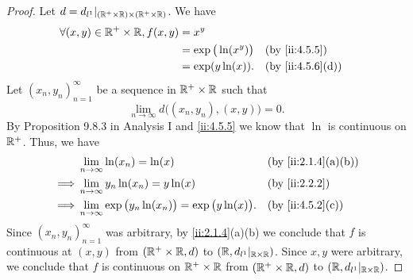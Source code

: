 \begin{proof}
  Let \(d = d_{l^1}|_{(\mathbb{R}^+ \times \mathbb{R}) \times (\mathbb{R}^+ \times \mathbb{R})}\).
  We have
  \begin{align*}
    \forall (x, y) \in \R^+ \times \R, f(x, y) & = x^y                                          \\
                                               & = \exp\big(\ln(x^y)\big) &  & \by{ii:4.5.5}    \\
                                               & = \exp(y \ln(x)).        &  & \by{ii:4.5.6}[d]
  \end{align*}
  Let \((x_n, y_n)_{n = 1}^\infty\) be a sequence in \(\mathbb{R}^+ \times \mathbb{R}\) such that
  \[
    \lim_{n \to \infty} d\big((x_n, y_n), (x, y)\big) = 0.
  \]
  By Proposition 9.8.3 in Analysis I and \cref{ii:4.5.5} we know that \(\ln\) is continuous on \(\mathbb{R}^+\).
  Thus, we have
  \begin{align*}
             & \lim_{n \to \infty} \ln(x_n) = \ln(x)                                    &  & \by{ii:2.1.4}[a,b] \\
    \implies & \lim_{n \to \infty} y_n \ln(x_n) = y \ln(x)                              &  & \by{ii:2.2.2}      \\
    \implies & \lim_{n \to \infty} \exp\big(y_n \ln(x_n)\big) = \exp\big(y \ln(x)\big). &  & \by{ii:4.5.2}[c]
  \end{align*}
  Since \((x_n, y_n)_{n = 1}^\infty\) was arbitrary, by \cref{ii:2.1.4}(a)(b) we conclude that \(f\) is continuous at \((x, y)\) from \((\mathbb{R}^+ \times \mathbb{R}, d)\) to \((\mathbb{R}, d_{l^1}|_{\mathbb{R} \times \mathbb{R}})\).
  Since \(x, y\) were arbitrary, we conclude that \(f\) is continuous on \(\mathbb{R}^+ \times \mathbb{R}\) from \((\mathbb{R}^+ \times \mathbb{R}, d)\) to \((\mathbb{R}, d_{l^1}|_{\mathbb{R} \times \mathbb{R}})\).
\end{proof}
